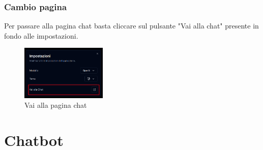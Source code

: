 \subsubsection{Cambio pagina}
Per passare alla pagina chat basta cliccare sul pulsante "Vai alla chat" presente in fondo alle impostazioni.
\begin{figure}[h!]
    \centering
    \includegraphics[width=0.364\textwidth]{settingdocchange.png}
    \caption{Vai alla pagina chat}\label{fig:changepage}
\end{figure}

\section{Chatbot}\label{sec}
\subsection{}